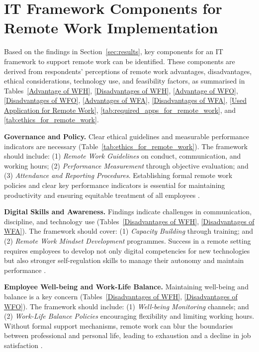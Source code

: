 \documentclass{infotel}
\begin{document}
\section{IT Framework Components for Remote Work Implementation}
\label{sec:it-framework}

Based on the findings in Section~\ref{sec:results}, key components for an IT framework to support remote work can be identified. These components are derived from respondents’ perceptions of remote work advantages, disadvantages, ethical considerations, technology use, and feasibility factors, as summarised in Tables~\ref{Advantage of WFH}, \ref{Disadvantages of WFH}, \ref{Advantage of WFO}, \ref{Disadvantages of WFO}, \ref{Advantages of WFA}, \ref{Disadvantages of WFA}, \ref{Used Application for Remote Work}, \ref{tab:required_apps_for_remote_work}, and \ref{tab:ethics_for_remote_work}.

\textbf{Governance and Policy.}
Clear ethical guidelines and measurable performance indicators are necessary (Table~\ref{tab:ethics_for_remote_work}). The framework should include: (1) \textit{Remote Work Guidelines} on conduct, communication, and working hours; (2) \textit{Performance Measurement} through objective evaluation; and (3) \textit{Attendance and Reporting Procedures}. Establishing formal remote work policies and clear key performance indicators is essential for maintaining productivity and ensuring equitable treatment of all employees \cite{Waizenegger2020, Charalampous2019 }.

\textbf{Digital Skills and Awareness.}
Findings indicate challenges in communication, discipline, and technology use (Tables~\ref{Disadvantages of WFH}, \ref{Disadvantages of WFA}). The framework should cover: (1) \textit{Capacity Building} through training; and (2) \textit{Remote Work Mindset Development} programmes. Success in a remote setting requires employees to develop not only digital competencies for new technologies but also stronger self-regulation skills to manage their autonomy and maintain performance \cite{Waizenegger2020, Charalampous2019 }.

\textbf{Employee Well-being and Work-Life Balance.}
Maintaining well-being and balance is a key concern (Tables~\ref{Disadvantages of WFH}, \ref{Disadvantages of WFO}). The framework should include: (1) \textit{Well-being Monitoring} channels; and (2) \textit{Work-Life Balance Policies} encouraging flexibility and limiting working hours. Without formal support mechanisms, remote work can blur the boundaries between professional and personal life, leading to exhaustion and a decline in job satisfaction \cite{Charalampous2019, Oakman2020}.
\end{document}
